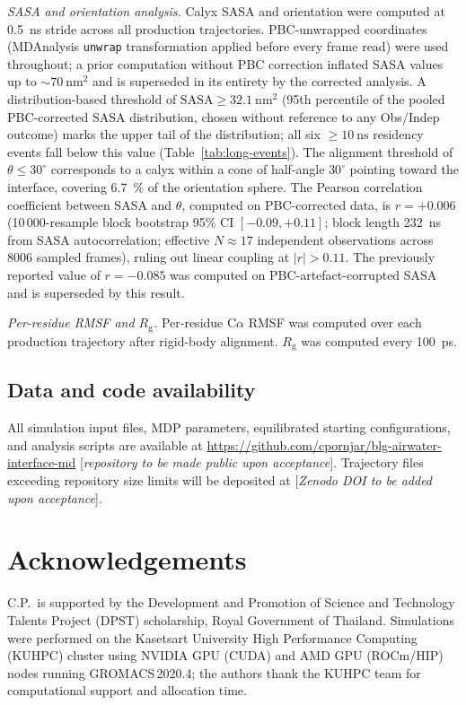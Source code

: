 \documentclass[11pt,a4paper]{article}
\begin{document}
\textit{SASA and orientation analysis.} Calyx SASA and orientation
were computed at \SI{0.5}{\nano\second} stride across all production
trajectories. PBC-unwrapped coordinates (MDAnalysis \texttt{unwrap}
transformation applied before every frame read) were used throughout;
a prior computation without PBC correction inflated SASA values up to
$\sim\!\SI{70}{\nano\metre\squared}$ and is superseded in its entirety
by the corrected analysis. A distribution-based threshold of
$\mathrm{SASA} \geq \SI{32.1}{\nano\metre\squared}$ (95th percentile
of the pooled PBC-corrected SASA distribution, chosen without reference
to any Obs/Indep outcome) marks the upper tail of the distribution;
all six $\geq\!\SI{10}{\nano\second}$ residency events fall below this
value (Table~\ref{tab:long-events}). The alignment threshold of
$\theta \leq 30^\circ$ corresponds to a calyx within a cone of
half-angle $30^\circ$ pointing toward the interface, covering
\SI{6.7}{\percent} of the orientation sphere. The Pearson correlation
coefficient between SASA and $\theta$, computed on PBC-corrected data,
is $r = +0.006$ (10\,000-resample block bootstrap 95\% CI
$[-0.09, +0.11]$; block length \SI{232}{\nano\second} from SASA
autocorrelation; effective $N \approx 17$ independent observations
across 8006 sampled frames), ruling out linear coupling at $|r| > 0.11$.
The previously reported value of $r = -0.085$ was
computed on PBC-artefact-corrupted SASA and is superseded by this
result.

\textit{Per-residue RMSF and $R_\mathrm{g}$.} Per-residue C$\alpha$ RMSF
was computed over each production trajectory after rigid-body alignment.
$R_\mathrm{g}$ was computed every \SI{100}{\pico\second}.

\subsection*{Data and code availability}

All simulation input files, MDP parameters, equilibrated starting
configurations, and analysis scripts are available at
\url{https://github.com/cpornjar/blg-airwater-interface-md}
[\textit{repository to be made public upon acceptance}]. Trajectory
files exceeding repository size limits will be deposited at
[\textit{Zenodo DOI to be added upon acceptance}].

\section*{Acknowledgements}
C.P.\ is supported by the Development and Promotion of Science and
Technology Talents Project (DPST) scholarship, Royal Government of
Thailand. Simulations were performed on the Kasetsart University High
Performance Computing (KUHPC) cluster using NVIDIA GPU (CUDA) and
AMD GPU (ROCm/HIP) nodes running GROMACS\,2020.4; the authors thank
the KUHPC team for computational support and allocation time.
\end{document}
